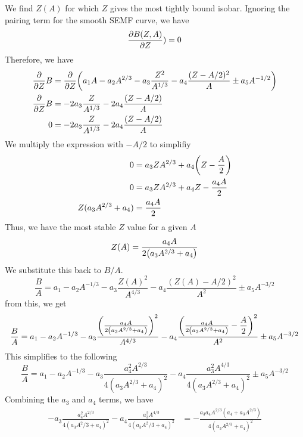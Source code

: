 \documentclass[12pt,a4paper]{article}
\begin{document}
\begin{solution_pset}
		We find $Z(A)$ for which $Z$ gives the most tightly bound isobar. Ignoring the pairing term for
		the smooth SEMF curve, we have
		\begin{equation}
			\pdv{B(Z,A)}{Z}) = 0
		\end{equation}
		Therefore, we have
		\begin{align}
			\pdv{}{Z} B &= \pdv{}{Z} \qty(a_1 A - a_2 A^{2/3} - a_3\frac{Z^2}{A^{1/3}} - a_4 \frac{(Z - A/2)^2}{A} \pm a_5 A^{-1/2})\\
			\pdv{}{Z} B &= - 2 a_3 \frac{Z}{A^{1/3}} - 2 a_4 \frac{(Z - A/2)}{A} \\
			0 &= - 2 a_3 \frac{Z}{A^{1/3}} - 2 a_4 \frac{(Z - A/2)}{A} 
		\end{align}
		We multiply the expression with $-A/2$ to simplifiy
		\begin{align}
			0 &= a_3 Z A^{2/3} + a_4 \qty(Z - \frac{A}{2} )\\
			0 &= a_3 Z A^{2/3} + a_4 Z - \frac{a_4 A}{2}\\
			Z(a_3  A^{2/3} + a_4 ) &= \frac{a_4 A}{2}
		\end{align}	
		Thus, we have the most stable $Z$ value for a given $A$ 
		\begin{equation}
			Z(A) = \frac{a_4 A}{2 \qty(a_3 A^{2/3} + a_4) }
			\label{eq: ZA}
		\end{equation}
		We substitute this back to $B/A$.
		\begin{equation}
		    \frac{B}{A} = a_1 - a_2 A^{-1/3} - a_3\frac{Z(A)^2}{A^{4/3}} - a_4 \frac{(Z(A) - A/2)^2}{A^2} \pm a_5 A^{-3/2}
		\end{equation}
		from this, we get
		\begin{equation}
		    \frac{B}{A} = 
				a_1 
				- a_2 A^{-1/3} 
				- a_3\frac{\qty( \frac{a_4 A}{2 \qty(a_3 A^{2/3} + a_4) })^2}{A^{4/3}} 
				- a_4 \frac{\qty( \frac{a_4 A}{2 \qty(a_3 A^{2/3} + a_4) } - \dfrac{A}{2}  )^2}{A^2} 
				\pm a_5 A^{-3/2}
		\end{equation}
		This simplifies to the following
		\begin{equation}
		    \frac{B}{A} = 
				a_1 
				- a_2 A^{-1/3} 
				- a_3 \frac{a_4^2 A^{2/3}}{4(a_3 A^{2/3} + a_4)^2} 
				- a_4 \frac{a_3^2 A^{4/3}}{4(a_3 A^{2/3} + a_4)^2}  
				\pm a_5 A^{-3/2}
		\end{equation}
		Combining the $a_3$ and $a_4$ terms, we have
		\begin{align}
				- a_3 \frac{a_4^2 A^{2/3}}{4(a_3 A^2/3 + a_4)^2} 
				- a_4 \frac{a_3^2 A^{4/3}}{4(a_3 A^2/3 + a_4)^2}  
				&= -\frac{a_3a_4A^{2/3} (a_4 + a_3 A^{2/3}) }{4 (a_3 A^{2/3} + a_4)^2} \\

\end{align}
\end{solution_pset}
\end{document}
